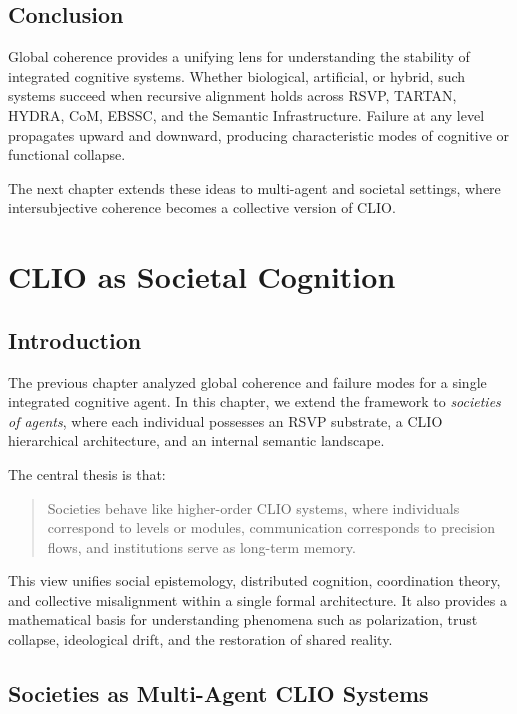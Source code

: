 \documentclass[12pt,oneside]{book}
\theoremstyle{plain}
\theoremstyle{definition}
\begin{document}
\section{Conclusion}

Global coherence provides a unifying lens for understanding the stability of
integrated cognitive systems.
Whether biological, artificial, or hybrid, such systems succeed when recursive
alignment holds across RSVP, TARTAN, HYDRA, CoM, EBSSC, and the Semantic
Infrastructure.
Failure at any level propagates upward and downward, producing characteristic
modes of cognitive or functional collapse.

The next chapter extends these ideas to multi-agent and societal settings,
where intersubjective coherence becomes a collective version of CLIO.

\chapter{CLIO as Societal Cognition}

\section{Introduction}

The previous chapter analyzed global coherence and failure modes for a single 
integrated cognitive agent.  
In this chapter, we extend the framework to \emph{societies of agents}, where each 
individual possesses an RSVP substrate, a CLIO hierarchical architecture, 
and an internal semantic landscape.

The central thesis is that:

\begin{quote}
Societies behave like higher-order CLIO systems, where individuals correspond to
levels or modules, communication corresponds to precision flows, and institutions
serve as long-term memory.
\end{quote}

This view unifies social epistemology, distributed cognition, coordination theory, 
and collective misalignment within a single formal architecture.  
It also provides a mathematical basis for understanding phenomena such as 
polarization, trust collapse, ideological drift, and the restoration of 
shared reality.

\section{Societies as Multi-Agent CLIO Systems}
\end{document}
